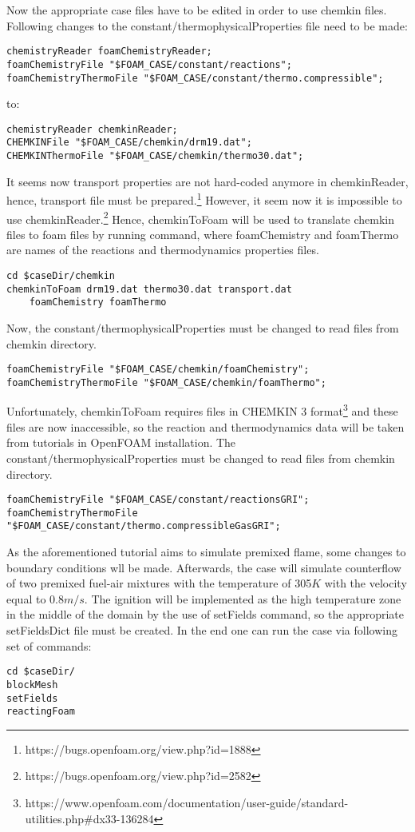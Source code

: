 \documentclass[12pt,english]{article}
\begin{document}
Now the appropriate case files have to be edited in order to use chemkin files. Following changes to the constant/thermophysicalProperties file need to be made:
\begin{lstlisting}
chemistryReader foamChemistryReader;
foamChemistryFile "$FOAM_CASE/constant/reactions";
foamChemistryThermoFile "$FOAM_CASE/constant/thermo.compressible";
\end{lstlisting}
to:
\begin{lstlisting}
chemistryReader chemkinReader;
CHEMKINFile "$FOAM_CASE/chemkin/drm19.dat";
CHEMKINThermoFile "$FOAM_CASE/chemkin/thermo30.dat";
\end{lstlisting}
It seems now transport properties are not hard-coded anymore in chemkinReader, hence, transport file must be prepared.\footnote{https://bugs.openfoam.org/view.php?id=1888} However, it seem now it is impossible to use chemkinReader.\footnote{https://bugs.openfoam.org/view.php?id=2582} Hence, chemkinToFoam will be used to translate chemkin files to foam files by running command, where foamChemistry and foamThermo are names of the reactions and thermodynamics properties files.
\begin{lstlisting}
cd $caseDir/chemkin
chemkinToFoam drm19.dat thermo30.dat transport.dat 
	foamChemistry foamThermo
\end{lstlisting}
Now, the constant/thermophysicalProperties must be changed to read files from chemkin directory.
\begin{lstlisting}
foamChemistryFile "$FOAM_CASE/chemkin/foamChemistry";
foamChemistryThermoFile "$FOAM_CASE/chemkin/foamThermo";
\end{lstlisting}
Unfortunately, chemkinToFoam requires files in CHEMKIN 3 format\footnote{https://www.openfoam.com/documentation/user-guide/standard-utilities.php\#dx33-136284} and these files are now inaccessible, so the reaction and thermodynamics data will be taken from tutorials in OpenFOAM installation.
The constant/thermophysicalProperties must be changed to read files from chemkin directory.
\begin{lstlisting}
foamChemistryFile "$FOAM_CASE/constant/reactionsGRI";
foamChemistryThermoFile "$FOAM_CASE/constant/thermo.compressibleGasGRI";
\end{lstlisting}

As the aforementioned tutorial aims to simulate premixed flame, some changes to boundary conditions wll be made. Afterwards, the case will simulate counterflow of two premixed fuel-air mixtures with the temperature of 305$K$ with the velocity equal to 0.8$m/s$. The ignition will be implemented as the high temperature zone in the middle of the domain by the use of setFields command, so the appropriate setFieldsDict file must be created.
In the end one can run the case via following set of commands:
\begin{lstlisting}
cd $caseDir/
blockMesh
setFields
reactingFoam
\end{lstlisting}
\end{document}
